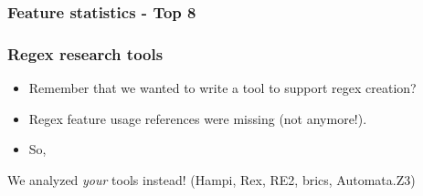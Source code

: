 %

%  
%



\begin{frame}[fragile]
\frametitle{Feature statistics - Top 8}
\begin{center}

\end{center}
\end{frame}



\begin{frame}
\frametitle{Regex research tools}

\begin{itemize}
\item Remember that we wanted to write a tool to support regex creation?
\item<2-> Regex feature usage references were missing (not anymore!).
\item <3-> So, 
\end{itemize}

\begin{block}{}%
\begin{large}We analyzed \emph{your} tools instead! (Hampi, Rex, RE2, brics, Automata.Z3)\end{large}
\end{block}


\end{frame}


